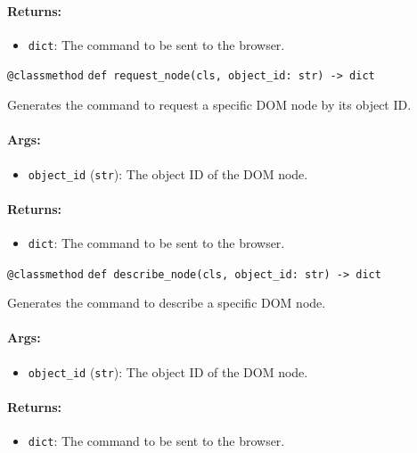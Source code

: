 \documentclass{article}
\begin{document}
\paragraph{Returns:}
\begin{itemize}
    \item \texttt{dict}: The command to be sent to the browser.
\end{itemize}

\noindent\texttt{@classmethod}
\noindent\texttt{def request\_node(cls, object\_id: str) -> dict}

\noindent Generates the command to request a specific DOM node by its object ID.

\paragraph{Args:}
\begin{itemize}
    \item \texttt{object\_id} (\texttt{str}): The object ID of the DOM node.
\end{itemize}

\paragraph{Returns:}
\begin{itemize}
    \item \texttt{dict}: The command to be sent to the browser.
\end{itemize}

\noindent\texttt{@classmethod}
\noindent\texttt{def describe\_node(cls, object\_id: str) -> dict}

\noindent Generates the command to describe a specific DOM node.

\paragraph{Args:}
\begin{itemize}
    \item \texttt{object\_id} (\texttt{str}): The object ID of the DOM node.
\end{itemize}

\paragraph{Returns:}
\begin{itemize}
    \item \texttt{dict}: The command to be sent to the browser.
\end{itemize}
\end{document}
